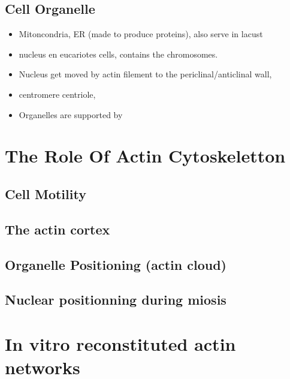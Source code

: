 \documentclass[A4paperpaper,11pt,english]{sphinxmanual}
\begin{document}
\subsection{Cell Organelle}
\label{parts/part1:cell-organelle}\begin{itemize}
\item {} 
Mitoncondria, ER (made to produce proteins), also serve in lacust

\item {} 
nucleus en eucariotes cells, contains the chromosomes.

\item {} 
Nucleus get moved by actin filement to the periclinal/anticlinal wall,

\item {} 
centromere centriole,

\item {} 
Organelles are supported by

\end{itemize}


\section{The Role Of Actin Cytoskeletton}
\label{parts/part1:the-role-of-actin-cytoskeletton}

\subsection{Cell Motility}
\label{parts/part1:cell-motility}

\subsection{The actin cortex}
\label{parts/part1:the-actin-cortex}

\subsection{Organelle Positioning (actin cloud)}
\label{parts/part1:organelle-positioning-actin-cloud}

\subsection{Nuclear positionning during miosis}
\label{parts/part1:nuclear-positionning-during-miosis}

\section{In vitro reconstituted actin networks}
\label{parts/part1:in-vitro-reconstituted-actin-networks}
\end{document}
